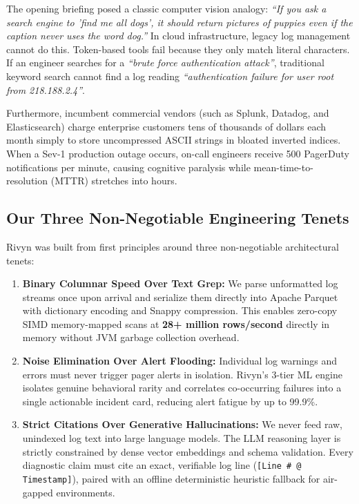 \documentclass[11pt,a4paper]{article}
\begin{document}
The opening briefing posed a classic computer vision analogy: \textit{``If you ask a search engine to 'find me all dogs', it should return pictures of puppies even if the caption never uses the word dog.''} In cloud infrastructure, legacy log management cannot do this. Token-based tools fail because they only match literal characters. If an engineer searches for a \textit{``brute force authentication attack''}, traditional keyword search cannot find a log reading \textit{``authentication failure for user root from 218.188.2.4''}.

Furthermore, incumbent commercial vendors (such as Splunk, Datadog, and Elasticsearch) charge enterprise customers tens of thousands of dollars each month simply to store uncompressed ASCII strings in bloated inverted indices. When a Sev-1 production outage occurs, on-call engineers receive 500 PagerDuty notifications per minute, causing cognitive paralysis while mean-time-to-resolution (MTTR) stretches into hours.

\subsection{Our Three Non-Negotiable Engineering Tenets}
Rivyn was built from first principles around three non-negotiable architectural tenets:
\begin{enumerate}[leftmargin=*]
    \item \textbf{Binary Columnar Speed Over Text Grep:} We parse unformatted log streams once upon arrival and serialize them directly into Apache Parquet with dictionary encoding and Snappy compression. This enables zero-copy SIMD memory-mapped scans at \textbf{28+ million rows/second} directly in memory without JVM garbage collection overhead.
    \item \textbf{Noise Elimination Over Alert Flooding:} Individual log warnings and errors must never trigger pager alerts in isolation. Rivyn's 3-tier ML engine isolates genuine behavioral rarity and correlates co-occurring failures into a single actionable incident card, reducing alert fatigue by up to 99.9\%.
    \item \textbf{Strict Citations Over Generative Hallucinations:} We never feed raw, unindexed log text into large language models. The LLM reasoning layer is strictly constrained by dense vector embeddings and schema validation. Every diagnostic claim must cite an exact, verifiable log line (\texttt{[Line \# @ Timestamp]}), paired with an offline deterministic heuristic fallback for air-gapped environments.
\end{enumerate}
\end{document}
